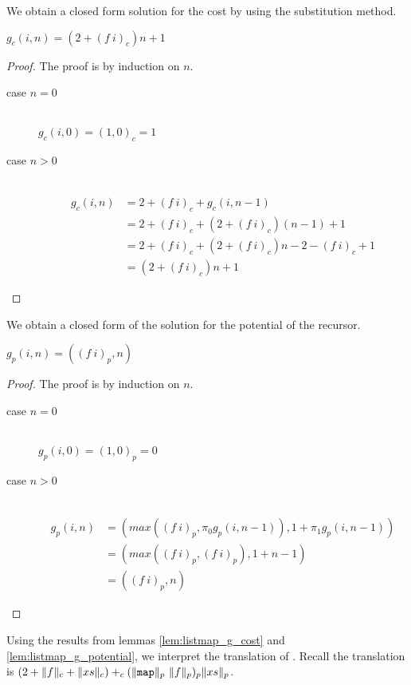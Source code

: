 %
We obtain a closed form solution for the cost by using the substitution method.
%
\begin{lemma}
  \label{lem:listmap_g_cost}
  $g_c(i,n) = (2 + (f\ i)_c) n + 1$
\end{lemma}
%
\begin{proof}
  The proof is by induction on $n$.
  \begin{description}
    \item[case $n=0$]\hfill \\
      $g_c(i,0) = (1,0)_c = 1$
    \item[case $n>0$]\hfill \\
      \begin{align*}
        g_c(i,n) &= 2 + (f\ i)_c + g_c(i,n-1)\\
                 &= 2 + (f\ i)_c + (2 + (f\ i)_c)(n-1) + 1\\
                 &= 2 + (f\ i)_c + (2 + (f\ i)_c) n - 2 - (f\ i)_c + 1\\
                 &= (2 + (f\ i)_c) n + 1
      \end{align*}
    \end{description}
\end{proof}
%
We obtain a closed form of the solution for the potential of the recursor.
%
\begin{lemma}
  \label{lem:listmap_g_potential}
  $g_p(i,n) = ((f\ i)_p, n)$
\end{lemma}
%
\begin{proof}
  The proof is by induction on $n$.
  \begin{description}
    \item[case $n=0$]\hfill \\
      $g_p(i,0) = (1,0)_p = 0$
    \item[case $n>0$]\hfill \\
      \begin{align*}
        g_p(i,n) &= (max((f\ i)_p,\pi_0g_p(i,n-1)), 1 + \pi_1 g_p(i,n-1)) \\
                 &= (max((f\ i)_p, (f\ i)_p), 1 + n - 1) \\
                 &= ((f\ i)_p, n)
      \end{align*}
  \end{description}
\end{proof}
%
Using the results from lemmas \ref{lem:listmap_g_cost} and
\ref{lem:listmap_g_potential}, we interpret the translation of .
Recall the translation is $(2 + \|f\|_c + \|xs\|_c) +_c (\|\T{map}\|_p\ \|f\|_p)_p \|xs\|_p$.
